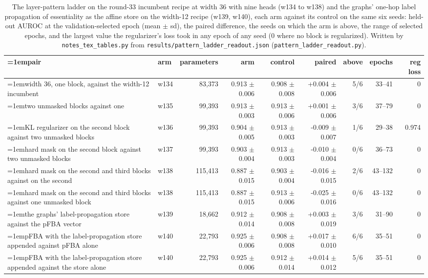 \begin{table}[H]
  \centering
  \footnotesize
  \setlength{\tabcolsep}{2.5pt}
  \caption[The layer-pattern ladder and the propagated label]{The layer-pattern ladder on the round-33 incumbent recipe at width 36 with nine heads (w134 to w138) and the graphs' one-hop label propagation of essentiality as the affine store on the width-12 recipe (w139, w140), each arm against its control on the same six seeds: held-out AUROC at the validation-selected epoch (mean $\pm$ sd), the paired difference, the seeds on which the arm is above, the range of selected epochs, and the largest value the regularizer's loss took in any epoch of any seed (0 where no block is regularized). Written by \texttt{notes\_tex\_tables.py} from \texttt{results/pattern\_ladder\_readout.json} (\texttt{pattern\_ladder\_readout.py}).}
  \label{tab:pattern-ladder}
  \begin{tabular}{@{}>{\raggedright\hangindent=1em\hangafter=1\arraybackslash}p{62.1mm}lrrrrrrr@{}}
    \hline
    pair & arm & parameters & arm & control & paired & above & epochs & reg loss \\
    \hline
    width 36, one block, against the width-12 incumbent & w134 & 83,373 & 0.913 $\pm$ 0.006 & 0.908 $\pm$ 0.008 & +0.004 $\pm$ 0.006 & 5/6 & 33--41 & 0 \\
    two unmasked blocks against one & w135 & 99,393 & 0.913 $\pm$ 0.003 & 0.913 $\pm$ 0.006 & +0.001 $\pm$ 0.006 & 3/6 & 37--79 & 0 \\
    KL regularizer on the second block against two unmasked blocks & w136 & 99,393 & 0.904 $\pm$ 0.005 & 0.913 $\pm$ 0.003 & -0.009 $\pm$ 0.007 & 1/6 & 29--38 & 0.974 \\
    hard mask on the second block against two unmasked blocks & w137 & 99,393 & 0.903 $\pm$ 0.004 & 0.913 $\pm$ 0.003 & -0.010 $\pm$ 0.004 & 0/6 & 36--73 & 0 \\
    hard mask on the second and third blocks against on the second & w138 & 115,413 & 0.887 $\pm$ 0.015 & 0.903 $\pm$ 0.004 & -0.016 $\pm$ 0.015 & 2/6 & 43--132 & 0 \\
    hard mask on the second and third blocks against one unmasked block & w138 & 115,413 & 0.887 $\pm$ 0.015 & 0.913 $\pm$ 0.006 & -0.025 $\pm$ 0.016 & 0/6 & 43--132 & 0 \\
    the graphs' label-propagation store against the pFBA vector & w139 & 18,662 & 0.912 $\pm$ 0.014 & 0.908 $\pm$ 0.008 & +0.003 $\pm$ 0.019 & 3/6 & 31--90 & 0 \\
    pFBA with the label-propagation store appended against pFBA alone & w140 & 22,793 & 0.925 $\pm$ 0.006 & 0.908 $\pm$ 0.008 & +0.017 $\pm$ 0.010 & 6/6 & 35--51 & 0 \\
    pFBA with the label-propagation store appended against the store alone & w140 & 22,793 & 0.925 $\pm$ 0.006 & 0.912 $\pm$ 0.014 & +0.014 $\pm$ 0.012 & 5/6 & 35--51 & 0 \\
    \hline
  \end{tabular}
\end{table}
